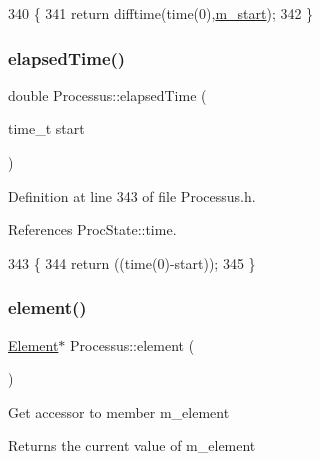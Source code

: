 \begin{DoxyCode}
340                        \{
341     \textcolor{keywordflow}{return} difftime(time(0),\hyperlink{classProcessus_a8ec00b2e12c5beada932610f30218e93}{m\_start});
342   \}
\end{DoxyCode}
\mbox{\label{classProcessus_a06d3815ad56593dfd0d3c1f534f8b146}} 
\subsubsection{\texorpdfstring{elapsed\+Time()}{elapsedTime()}\hspace{0.1cm}{\footnotesize\ttfamily [2/2]}}
{\footnotesize\ttfamily double Processus\+::elapsed\+Time (\begin{DoxyParamCaption}\item[{time\+\_\+t}]{start }\end{DoxyParamCaption})\hspace{0.3cm}{\ttfamily [inline]}}



Definition at line 343 of file Processus.\+h.



References Proc\+State\+::time.


\begin{DoxyCode}
343                                    \{
344     \textcolor{keywordflow}{return} ((time(0)-start));
345   \}
\end{DoxyCode}
\mbox{\label{classProcessus_a6fe155527431a7190b7d44d600b9608d}} 
\subsubsection{\texorpdfstring{element()}{element()}}
{\footnotesize\ttfamily \hyperlink{classElement}{Element}$\ast$ Processus\+::element (\begin{DoxyParamCaption}{ }\end{DoxyParamCaption})\hspace{0.3cm}{\ttfamily [inline]}}

Get accessor to member m\+\_\+element \begin{DoxyReturn}{Returns}
the current value of m\+\_\+element 
\end{DoxyReturn}


